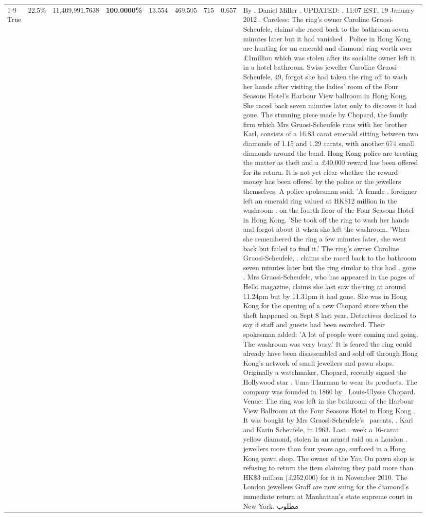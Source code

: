 \begin{table}[H]
\begin{tabular}{lllrlllll}
\cline{1-9}
True & 22.5\% & 11,409,991.7638 & \bfseries \color{red} 100.0000\% & 13.554 & 469.505 & 715 & 0.657 & By . Daniel Miller . UPDATED: . 11:07 EST, 19 January 2012 . Careless: The ring's owner Caroline Gruosi-Scheufele, claims she raced back to the bathroom seven minutes later but it had vanished . Police in Hong Kong are hunting for an emerald and diamond ring worth over £1million which was stolen after its socialite owner left it in a hotel bathroom. Swiss jeweller Caroline Gruosi-Scheufele, 49, forgot she had taken the ring off to wash her hands after visiting the ladies' room of the Four Seasons Hotel's Harbour View ballroom in Hong Kong. She raced back seven minutes later only to discover it had gone. The stunning piece made by Chopard, the family firm which Mrs Gruosi-Scheufele runs with her brother Karl, consists of a 16.83 carat emerald sitting between two diamonds of 1.15 and 1.29 carats, with another 674 small diamonds around the band. Hong Kong police are treating the matter as theft and a £40,000 reward has been offered for its return. It is not yet clear whether the reward money has been offered by the police or the jewellers themselves. A police spokesman said: 'A female . foreigner left an emerald ring valued at HK\$12 million in the washroom . on the fourth floor of the Four Seasons Hotel in Hong Kong. 'She took off the ring to wash her hands and forgot about it when she left the washroom. 'When she remembered the ring a few minutes later, she went back but failed to find it.' The ring's owner Caroline Gruosi-Scheufele, . claims she raced back to the bathroom seven minutes later but the ring similar to this had . gone . Mrs Gruosi-Scheufele, who has appeared in the pages of Hello magazine, claims she last saw the ring at around 11.24pm but by 11.31pm it had gone. She was in Hong Kong for the opening of a new Chopard store when the theft happened on Sept 8 last year. Detectives declined to say if staff and guests had been searched. Their spokesman added: 'A lot of people were coming and going. The washroom was very busy.' It is feared the ring could already have been disassembled and sold off through Hong Kong's network of small jewellers and pawn shops. Originally a watchmaker, Chopard, recently signed the Hollywood star . Uma Thurman to wear its products. The company was founded in 1860 by . Louis-Ulysse Chopard. Venue: The ring was left in the bathroom of the Harbour View Ballroom at the Four Seasons Hotel in Hong Kong . It was bought by Mrs Gruosi-Scheufele's  parents, . Karl and Karin Scheufele, in 1963. Last . week a 16-carat yellow diamond, stolen in an armed raid on a London . jewellers more than four years ago, surfaced in a Hong Kong pawn shop. The owner of the Yau On pawn shop is refusing to return the item claiming they paid more than HK\$3 million (£252,000) for it in November 2010. The London jewellers Graff are now suing for the diamond’s immediate return at Manhattan’s state supreme court in New York. مطلوب \\

\end{tabular}
\end{table}
